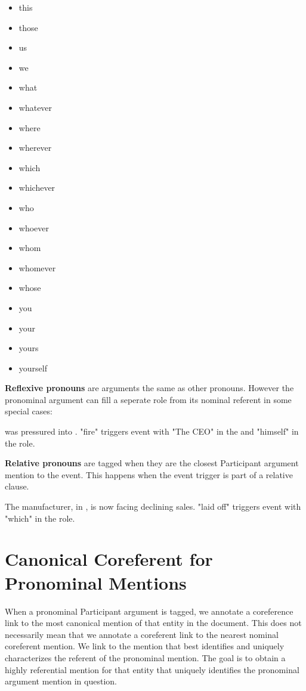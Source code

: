 \begin{multicols}{5}
\begin{itemize}[noitemsep]
    \item this \item those \item us \item we \item what 
    \item whatever \item where \item wherever \item which \item whichever 
    \item who \item whoever \item whom \item whomever \item whose 
    \item you \item your \item yours \item yourself
\end{itemize}
\end{multicols}

\noindent\textbf{Reflexive pronouns} are arguments the same as other pronouns.
However the pronominal argument can fill a seperate role from its nominal referent in some special cases:

\begin{exe}
    \ex {} was pressured into  .
        \expl "fire" triggers  event with "The CEO" in the  and "himself" in the  role.
\end{exe}

\noindent\textbf{Relative pronouns} are tagged when they are the closest Participant argument mention to the event.
This happens when the event trigger is part of a relative clause.

\begin{exe}
    \ex The manufacturer,    in , is now facing declining sales.
        \expl "laid off" triggers  event with "which" in the  role.
\end{exe}


\section{Canonical Coreferent for Pronominal Mentions}
When a pronominal Participant argument is tagged, we annotate a coreference link to the most canonical mention of that entity in the document.
This does not necessarily mean that we annotate a coreferent link to the nearest nominal coreferent mention.
We link to the mention that best identifies and uniquely characterizes the referent of the pronominal mention.
The goal is to obtain a highly referential mention for that entity that uniquely identifies the pronominal argument mention in question.

